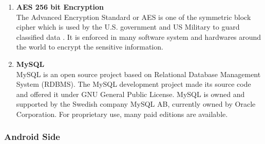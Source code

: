 \documentclass[12pt, a4paper]{article}
\begin{document}
\begin{enumerate}[leftmargin=1.5cm]
\item \textbf{AES 256 bit Encryption}\\The Advanced Encryption Standard or AES is one of the symmetric block cipher which is used by the U.S. government and US Military to guard classified data . It is enforced in many software system and hardwares around the world to encrypt the  sensitive information.
\item \textbf{MySQL}\\MySQL  is an open source project based on Relational Database Management System (RDBMS). The MySQL development project made its source code and offered it under GNU General Public License. MySQL is owned  and supported by  the Swedish company MySQL AB, currently owned  by Oracle Corporation. For proprietary use, many paid editions are available.
\end{enumerate}
\subsubsection{Android Side}
\end{document}
